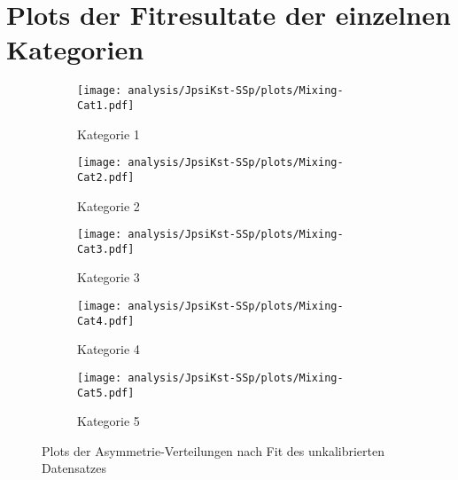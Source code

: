 

\appendix

\section{Plots der Fitresultate der einzelnen Kategorien}

\begin{figure}
        \centering
        \begin{subfigure}[b]{0.49\textwidth}
                \centering
                \texttt{[image: analysis/JpsiKst-SSp/plots/Mixing-Cat1.pdf]}
                \caption{Kategorie 1}
        \end{subfigure}
        \begin{subfigure}[b]{0.49\textwidth}
                \centering
                \texttt{[image: analysis/JpsiKst-SSp/plots/Mixing-Cat2.pdf]}
                \caption{Kategorie 2}
        \end{subfigure}

        \begin{subfigure}[b]{0.49\textwidth}
                \centering
                \texttt{[image: analysis/JpsiKst-SSp/plots/Mixing-Cat3.pdf]}
                \caption{Kategorie 3}
        \end{subfigure}
        \begin{subfigure}[b]{0.49\textwidth}
                \centering
                \texttt{[image: analysis/JpsiKst-SSp/plots/Mixing-Cat4.pdf]}
                \caption{Kategorie 4}
        \end{subfigure}

        \begin{subfigure}[b]{0.49\textwidth}
                \centering
                \texttt{[image: analysis/JpsiKst-SSp/plots/Mixing-Cat5.pdf]}
                \caption{Kategorie 5}
        \end{subfigure}
        \caption{Plots der Asymmetrie-Verteilungen nach Fit des unkalibrierten Datensatzes}
\end{figure}

